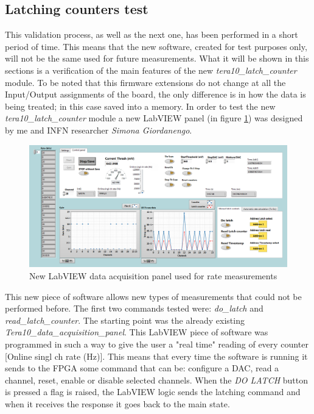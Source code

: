 \subsection{Latching counters test}
This validation process, as well as the next one, has been performed in a short period of time. This means that the new software, created for test purposes only, will not be the same used for future measurements. What it will be shown in this sections is a verification of the main features of the new \textit{tera10\_latch\_counter} module.
\newline
To be noted that this firmware extensions do not change at all the Input/Output assignments of the board, the only difference is in how the data is being treated; in this case saved into a memory.
In order to test the new \textit{tera10\_latch\_counter} module a new LabVIEW panel (in figure \ref{fig:newlabviewpanel}) was designed by me and INFN researcher \textit{Simona Giordanengo}.
\begin{figure}[H]
	\centering
	\includegraphics[width=0.99\linewidth]{IMG/ch5/latch_tests/fig1.PNG}
	\caption{New LabVIEW data acquisition panel used for rate measurements}
	\label{fig:newlabviewpanel}
\end{figure}
\noindent This new piece of software allows new types of measurements that could not be performed before.
The first two commands tested were: \textit{do\_latch} and \textit{read\_latch\_counter}. The starting point was the already existing \textit{Tera10\_data\_acquisition\_panel}. This LabVIEW piece of software was programmed in such a way to give the user a "real time" reading of every counter [Online singl ch rate (Hz)].
This means that every time the software is running it sends to the FPGA some command that can be: configure a DAC, read a channel, reset, enable or disable selected channels.
When the \textit{DO LATCH} button is pressed a flag is raised, the LabVIEW logic sends the latching command and when it receives the response it goes back to the main state.

